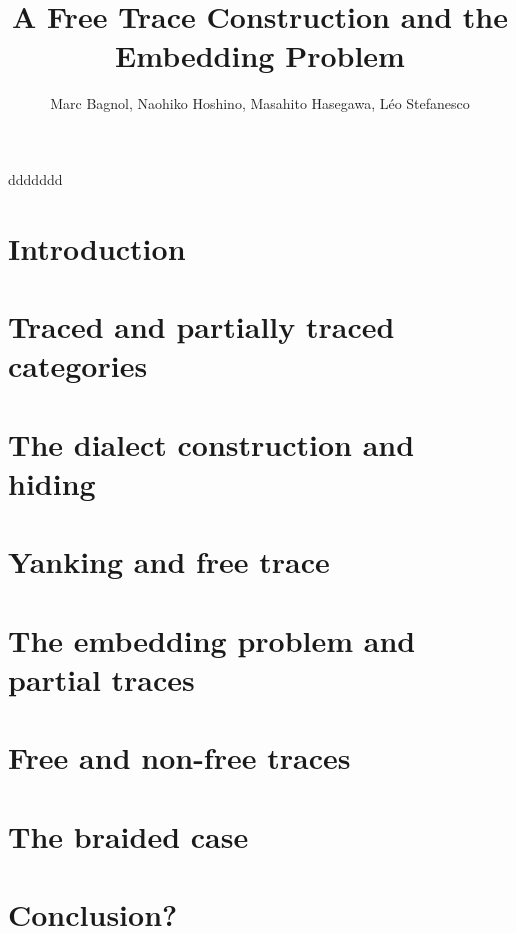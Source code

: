 \documentclass{article}
\begin{document}


\title{A Free Trace Construction and the Embedding Problem}

\author{Marc Bagnol, Naohiko Hoshino, Masahito Hasegawa, Léo Stefanesco}

\maketitle

\begin{abstract}
	
\end{abstract}
ddddddd
\section*{Introduction}


\section{Traced and partially traced categories}


\section{The dialect construction and hiding}


\section{Yanking and free trace}



\section{The embedding problem and partial traces}


\section{Free and non-free traces}



\section{The braided case}


\section*{Conclusion?}
%




\end{document}
